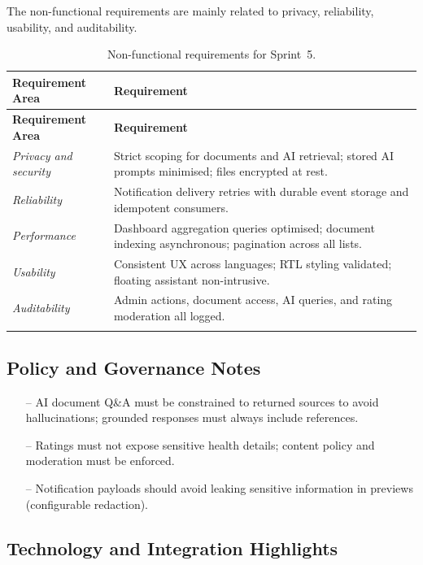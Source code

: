\documentclass[a4paper,12pt]{report}
\begin{document}
The non-functional requirements are mainly related to privacy, reliability, usability, and
auditability.

\begin{longtable}{@{} L{0.27\textwidth} L{0.65\textwidth} @{}}
\toprule
\textbf{Requirement Area} &
\textbf{Requirement} \\
\midrule
\endfirsthead

\toprule
\textbf{Requirement Area} &
\textbf{Requirement} \\
\midrule
\endhead

\emph{Privacy and security} & Strict scoping for documents and AI retrieval; stored AI
prompts minimised; files encrypted at rest. \\
\midrule
\emph{Reliability} & Notification delivery retries with durable event storage and
idempotent consumers. \\
\midrule
\emph{Performance} & Dashboard aggregation queries optimised; document indexing
asynchronous; pagination across all lists. \\
\midrule
\emph{Usability} & Consistent UX across languages; RTL styling validated; floating
assistant non-intrusive. \\
\midrule
\emph{Auditability} & Admin actions, document access, AI queries, and rating
moderation all logged. \\
\bottomrule
\caption{Non-functional requirements for Sprint~5.}
\label{tab:sprint5-non-functional-requirements}\\
\end{longtable}

\subsection{Policy and Governance Notes}

\begin{itemize}[leftmargin=*]
  \item[--] AI document Q\&A must be constrained to returned sources to avoid hallucinations;
        grounded responses must always include references.
  \item[--] Ratings must not expose sensitive health details; content policy and moderation
        must be enforced.
  \item[--] Notification payloads should avoid leaking sensitive information in previews
        (configurable redaction).
\end{itemize}

\subsection{Technology and Integration Highlights}
 
\end{document}
